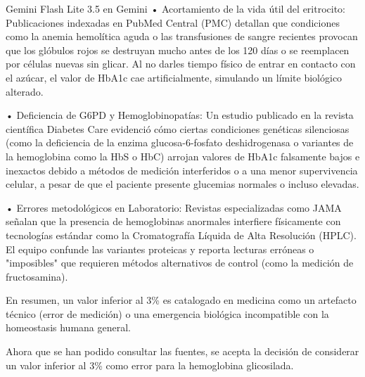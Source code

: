 \documentclass[12pt,a4paper,oneside]{book}
\begin{document}
\begin{iaresp}{Gemini Flash Lite 3.5 en Gemini}
• Acortamiento de la vida útil del eritrocito: Publicaciones indexadas en PubMed Central (PMC) detallan que condiciones como la anemia hemolítica aguda o las transfusiones de sangre recientes provocan que los glóbulos rojos se destruyan mucho antes de los 120 días o se reemplacen por células nuevas sin glicar. Al no darles tiempo físico de entrar en contacto con el azúcar, el valor de HbA1c cae artificialmente, simulando un límite biológico alterado.

• Deficiencia de G6PD y Hemoglobinopatías: Un estudio publicado en la revista científica Diabetes Care evidenció cómo ciertas condiciones genéticas silenciosas (como la deficiencia de la enzima glucosa-6-fosfato deshidrogenasa o variantes de la hemoglobina como la HbS o HbC) arrojan valores de HbA1c falsamente bajos e inexactos debido a métodos de medición interferidos o a una menor supervivencia celular, a pesar de que el paciente presente glucemias normales o incluso elevadas.

• Errores metodológicos en Laboratorio: Revistas especializadas como JAMA señalan que la presencia de hemoglobinas anormales interfiere físicamente con tecnologías estándar como la Cromatografía Líquida de Alta Resolución (HPLC). El equipo confunde las variantes proteicas y reporta lecturas erróneas o "imposibles" que requieren métodos alternativos de control (como la medición de fructosamina).

En resumen, un valor inferior al 3\% es catalogado en medicina como un artefacto técnico (error de medición) o una emergencia biológica incompatible con la homeostasis humana general.
\end{iaresp}
\begin{iaanalisis}
Ahora que se han podido consultar las fuentes, se acepta la decisión de considerar un valor inferior al 3\% como error para la hemoglobina glicosilada.
\end{iaanalisis}
\end{document}
